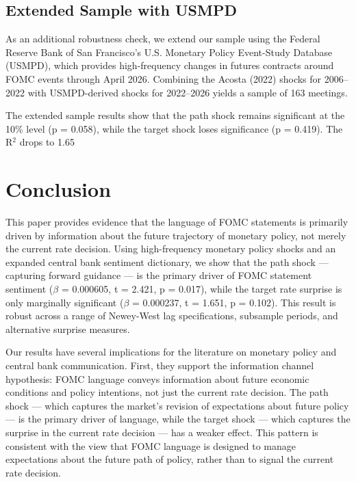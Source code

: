 \documentclass[12pt]{article}
\begin{document}
\subsection{Extended Sample with USMPD}

As an additional robustness check, we extend our sample using the Federal Reserve Bank of San Francisco's U.S. Monetary Policy Event-Study Database (USMPD), which provides high-frequency changes in futures contracts around FOMC events through April 2026. Combining the Acosta (2022) shocks for 2006–2022 with USMPD-derived shocks for 2022–2026 yields a sample of 163 meetings.

The extended sample results show that the path shock remains significant at the 10\% level (p = 0.058), while the target shock loses significance (p = 0.419). The R$^2$ drops to 1.65%


\section{Conclusion}

This paper provides evidence that the language of FOMC statements is primarily driven by information about the future trajectory of monetary policy, not merely the current rate decision. Using high-frequency monetary policy shocks and an expanded central bank sentiment dictionary, we show that the path shock --- capturing forward guidance --- is the primary driver of FOMC statement sentiment ($\beta$ = 0.000605, t = 2.421, p = 0.017), while the target rate surprise is only marginally significant ($\beta$ = 0.000237, t = 1.651, p = 0.102). This result is robust across a range of Newey-West lag specifications, subsample periods, and alternative surprise measures.

Our results have several implications for the literature on monetary policy and central bank communication. First, they support the information channel hypothesis: FOMC language conveys information about future economic conditions and policy intentions, not just the current rate decision. The path shock --- which captures the market's revision of expectations about future policy --- is the primary driver of language, while the target shock --- which captures the surprise in the current rate decision --- has a weaker effect. This pattern is consistent with the view that FOMC language is designed to manage expectations about the future path of policy, rather than to signal the current rate decision.
\end{document}
